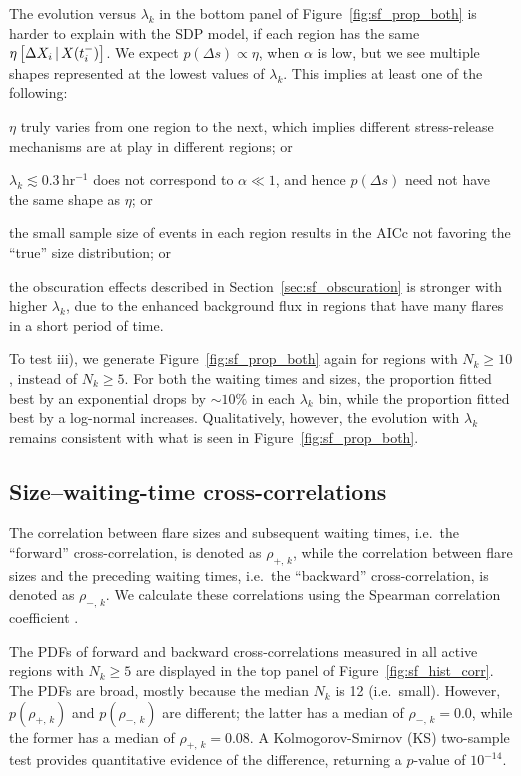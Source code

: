 The evolution versus $\lambda_k$ in the bottom panel of Figure~\ref{fig:sf_prop_both} is harder to explain with the SDP model, if each region has the same $\eta\left[\Delta X_{i}\,|\,X(t_i^-)\right]$. We expect $p(\Delta s) \propto \eta$, when $\alpha$ is low, but we see multiple shapes represented at the lowest values of $\lambda_k$. This implies at least one of the following: \begin{enumerate*} \item $\eta$ truly varies from one region to the next, which implies different stress-release mechanisms are at play in different regions; or \item $\lambda_k \lesssim 0.3\,$hr$^{-1}$ does not correspond to $\alpha \ll 1$, and hence $p(\Delta s)$ need not have the same shape as $\eta$; or \item the small sample size of events in each region results in the AICc not favoring the ``true'' size distribution; or \item the obscuration effects described in Section~\ref{sec:sf_obscuration} is stronger with higher $\lambda_k$, due to the enhanced background flux in regions that have many flares in a short period of time. \end{enumerate*} To test iii), we generate Figure~\ref{fig:sf_prop_both} again for regions with $N_k \geq 10$, instead of $N_k \geq 5$. For both the waiting times and sizes, the proportion fitted best by an exponential drops by $\sim 10\%$ in each $\lambda_k$ bin, while the proportion fitted best by a log-normal increases. Qualitatively, however, the evolution with $\lambda_k$ remains consistent with what is seen in Figure~\ref{fig:sf_prop_both}.

\subsection{Size--waiting-time cross-correlations} \label{sec:sf_corr}
The correlation between flare sizes and subsequent waiting times, i.e.~the ``forward'' cross-correlation, is denoted as $\rho_{+,\,k}$, while the correlation between flare sizes and the preceding waiting times, i.e.~the ``backward'' cross-correlation, is denoted as $\rho_{-,\,k}$. We calculate these correlations using the Spearman correlation coefficient \citep{Lehmann2006}.

The PDFs of forward and backward cross-correlations measured in all active regions with $N_k \geq 5$ are displayed in the top panel of Figure~\ref{fig:sf_hist_corr}. The PDFs are broad, mostly because the median $N_k$ is 12 (i.e.~small). However, $p(\rho_{+,\,k})$ and $p(\rho_{-,\,k})$ are different; the latter has a median of $\rho_{-,\,k} = 0.0$, while the former has a median of $\rho_{+,\,k} = 0.08$. A Kolmogorov-Smirnov (KS) two-sample test provides quantitative evidence of the difference, returning a $p$-value of $10^{-14}$.

